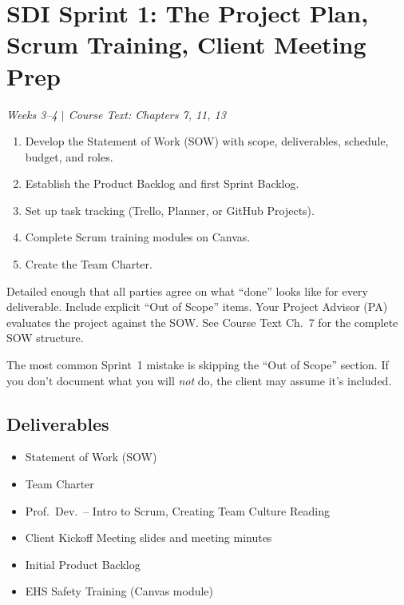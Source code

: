 \section{SDI Sprint 1: The Project Plan, Scrum Training, Client Meeting Prep}
\textit{Weeks 3--4 $|$ Course Text: Chapters 7, 11, 13}

\begin{priorities}
\begin{enumerate}[nosep]
\item Develop the Statement of Work (SOW) with scope, deliverables, schedule, budget, and roles.
\item Establish the Product Backlog and first Sprint Backlog.
\item Set up task tracking (Trello, Planner, or GitHub Projects).
\item Complete Scrum training modules on Canvas.
\item Create the Team Charter.
\end{enumerate}
\end{priorities}

\begin{faqbox}
Detailed enough that all parties agree on what ``done'' looks like for every deliverable. Include explicit ``Out of Scope'' items. Your Project Advisor (PA) evaluates the project against the SOW. See Course Text Ch.~7 for the complete SOW structure.
\end{faqbox}

\begin{warnbox}
The most common Sprint~1 mistake is skipping the ``Out of Scope'' section. If you don't document what you will \emph{not} do, the client may assume it's included.
\end{warnbox}

\subsection{Deliverables}
\begin{itemize}[nosep,leftmargin=1.5em]
\item Statement of Work (SOW)
\item Team Charter
\item Prof.~Dev.~-- Intro to Scrum, Creating Team Culture Reading
\item Client Kickoff Meeting slides and meeting minutes
\item Initial Product Backlog
\item EHS Safety Training (Canvas module)
\end{itemize}


